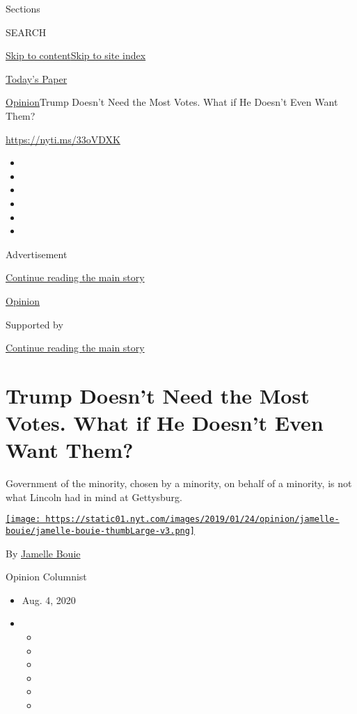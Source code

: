 Sections

SEARCH

\protect\hyperlink{site-content}{Skip to
content}\protect\hyperlink{site-index}{Skip to site index}

\href{https://myaccount.nytimes.com/auth/login?response_type=cookie\&client_id=vi}{}

\href{https://www.nytimes.com/section/todayspaper}{Today's Paper}

\href{/section/opinion}{Opinion}\textbar{}Trump Doesn't Need the Most
Votes. What if He Doesn't Even Want Them?

\href{https://nyti.ms/33oVDXK}{https://nyti.ms/33oVDXK}

\begin{itemize}
\item
\item
\item
\item
\item
\item
\end{itemize}

Advertisement

\protect\hyperlink{after-top}{Continue reading the main story}

\href{/section/opinion}{Opinion}

Supported by

\protect\hyperlink{after-sponsor}{Continue reading the main story}

\hypertarget{trump-doesnt-need-the-most-votes-what-if-he-doesnt-even-want-them}{%
\section{Trump Doesn't Need the Most Votes. What if He Doesn't Even Want
Them?}\label{trump-doesnt-need-the-most-votes-what-if-he-doesnt-even-want-them}}

Government of the minority, chosen by a minority, on behalf of a
minority, is not what Lincoln had in mind at Gettysburg.

\href{https://www.nytimes.com/column/jamelle-bouie}{\texttt{[image: https://static01.nyt.com/images/2019/01/24/opinion/jamelle-bouie/jamelle-bouie-thumbLarge-v3.png]}}

By \href{https://www.nytimes.com/column/jamelle-bouie}{Jamelle Bouie}

Opinion Columnist

\begin{itemize}
\item
  Aug. 4, 2020
\item
  \begin{itemize}
  \item
  \item
  \item
  \item
  \item
  \item
  \end{itemize}
\end{itemize}

